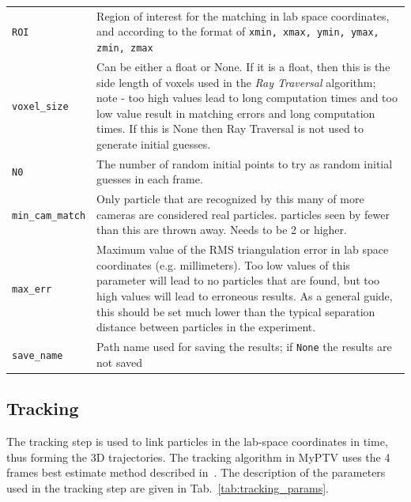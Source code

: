 \documentclass[10pt,a4paper]{article}
\begin{document}
\begin{table}[!ht]
\begin{tabular}{l m{13cm}}
		\texttt{ROI} & Region of interest for the matching in lab space coordinates, and according to the format of \texttt{xmin, xmax, ymin, ymax, zmin, zmax} \\[.1cm]
		
		\texttt{voxel\_size} & Can be either a float or None. If it is a float, then this is the side length of voxels used in the \textit{Ray Traversal} algorithm; note - too high values lead to long computation times and too low value result in matching errors and long computation times. If this is None then Ray Traversal is not used to generate initial guesses. \\[.1cm]
		
		\texttt{N0} &  The number of random initial points to try as random initial guesses in each frame.\\[.1cm]
		
		\texttt{min\_cam\_match} & Only particle that are recognized by this many of more cameras are considered real particles. particles seen by fewer than this are thrown away. Needs to be 2 or higher. \\[.1cm]
		
		\texttt{max\_err} & Maximum value of the RMS triangulation error in lab space coordinates (e.g. millimeters). Too low values of this parameter will lead to no particles that are found, but too high values will lead to erroneous results. As a general guide, this should be set much lower than the typical separation distance between particles in the experiment.  \\[.1cm]
		
		\texttt{save\_name} & Path name used for saving the results; if \texttt{None} the results are not saved \\[.1cm]
		
		\hline
	\end{tabular}
\end{table}







\subsection{Tracking}\label{sec:workflow_track}

The tracking step is used to link particles in the lab-space coordinates in time, thus forming the 3D trajectories. The tracking algorithm in MyPTV uses the 4 frames best estimate method described in~\cite{Ouellette2006}. The description of the parameters used in the tracking step are given in Tab.~\ref{tab:tracking_params}. 
\end{document}
